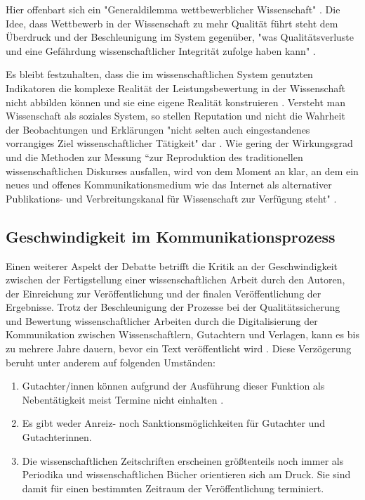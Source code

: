 Hier offenbart sich ein "Generaldilemma wettbewerblicher Wissenschaft" \cite[:37]{wr_2015_wissenschaft_integritaet}. Die Idee, dass Wettbewerb in der Wissenschaft zu mehr Qualität führt steht dem Überdruck und der Beschleunigung im System gegenüber, "was Qualitätsverluste und eine Gefährdung wissenschaftlicher Integrität zufolge haben kann" \cite[:37]{wr_2015_wissenschaft_integritaet}.

Es bleibt festzuhalten, dass die im wissenschaftlichen System genutzten Indikatoren die komplexe Realität der Leistungsbewertung in der Wissenschaft nicht abbilden können und sie eine eigene Realität konstruieren \cite{Hornbostel_1997}. Versteht man Wissenschaft als soziales System, so stellen Reputation und nicht die Wahrheit der Beobachtungen und Erklärungen "nicht selten auch eingestandenes vorrangiges Ziel wissenschaftlicher Tätigkeit" dar \cite{luhmann_1970_selbststeuerung}. Wie gering der Wirkungsgrad und die Methoden zur Messung “zur Reproduktion des traditionellen wissenschaftlichen Diskurses ausfallen, wird von dem Moment an klar, an dem ein neues und offenes Kommunikationsmedium wie das Internet als alternativer Publikations- und Verbreitungskanal für Wissenschaft zur Verfügung steht" \cite{Rost_1998}.

\subsection{Geschwindigkeit im Kommunikationsprozess}

Einen weiterer Aspekt der Debatte betrifft die Kritik an der Geschwindigkeit zwischen der Fertigstellung einer wissenschaftlichen Arbeit durch den Autoren, der Einreichung zur Veröffentlichung und der finalen Veröffentlichung der Ergebnisse. Trotz der Beschleunigung der Prozesse bei der Qualitätssicherung und Bewertung wissenschaftlicher Arbeiten durch die Digitalisierung der Kommunikation zwischen Wissenschaftlern, Gutachtern und Verlagen, kann es bis zu mehrere Jahre dauern, bevor ein Text veröffentlicht wird \cite{nosek_2012_scientific}. Diese Verzögerung beruht unter anderem auf folgenden Umständen:

\begin{enumerate}
\item Gutachter/innen können aufgrund der Ausführung dieser Funktion als Nebentätigkeit meist Termine nicht einhalten \cite{bar_2009_wissenschaftliche}.
\item Es gibt weder Anreiz- noch Sanktionsmöglichkeiten für Gutachter und Gutachterinnen.
\item Die wissenschaftlichen Zeitschriften erscheinen größtenteils noch immer als Periodika und wissenschaftlichen Bücher orientieren sich am Druck. Sie sind damit für einen bestimmten Zeitraum der Veröffentlichung terminiert.
\end{enumerate}

